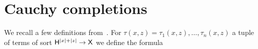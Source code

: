 \documentclass{amsproc}
\begin{document}
{\begin{comment}
\begin{proof}
  Let $\varphi(x)$ be a positive formula.
  We need to prove that for every $\varphi'>\varphi$ there is some formula $\psi(x)\in{\EuScript F}^{\rm p}_{{\sf X}{\rm qf}}$ such that $\varphi(x)\rightarrow\psi(x)\rightarrow\varphi'(x)$.
  By Corollary~\ref{corol_Lcomplete} and Proposition~\ref{prop_approx}

  \ceq{\hfill\neg\varphi(x)}{\rightarrow}{\bigvee_{p'(x)\rightarrow\neg\varphi(x)}p'(x)}

  where $p(x)$ ranges over the maximally consistent ${\EuScript F}^{\rm p}_{{\sf X}{\rm qf}}$-types.
  By Fact~\ref{fact_compactness_imp} and Lemma~\ref{lem_interpolation}

  \ceq{\hfill\neg\varphi(x)}{\rightarrow}{\bigvee_{\neg\tilde{\psi}(x)\rightarrow\neg\varphi(x)}\neg\tilde{\psi}(x),}

  where $\tilde{\psi}(x)\in{\EuScript F}^{\rm p}_{{\sf X}{\rm qf}}$.
  Equivalently,

  \ceq{\hfill\varphi(x)}{\leftarrow}{\bigwedge_{\tilde{\psi}(x)\leftarrow\varphi(x)}\tilde{\psi}(x).}

  By compactness, see Fact~\ref{fact_compactness_imp}, for every $\varphi'>\varphi$ there are some finitely many $\tilde{\psi}_i(x)\in{\EuScript F}^{\rm p}_{{\sf X}{\rm qf}}$ such that

  \ceq{\hfill\varphi'(x)}{\leftarrow}{\bigwedge_{i=1,\dots,n}\tilde{\psi}_i(x)\ \ \leftarrow\ \ \varphi(x)}

  which yields the interpolant required by the proposition.
\end{proof}


  
\end{comment}

\section{Cauchy completions}\label{Cauchy}

We recall a few definitions from~\cite{clcl}. For $\tau(x,z)=\tau_1(x,z),\dots,\tau_n(x,z)$ a tuple of terms of sort ${\sf H}^{|x|+|z|}\to {\sf X}$ we define the formula

}
\end{document}
